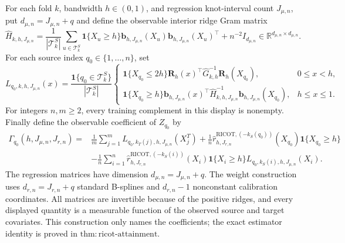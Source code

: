 For each fold \(k\), bandwidth \(h\in(0,1)\), and regression knot-interval count \(J_{\mu,n}\), put \(d_{\mu,n}=J_{\mu,n}+q\) and define the observable interior ridge Gram matrix
\[
\widehat H_{k,h,J_{\mu,n}}
=\frac1{|\mathcal T^S_k|}\sum_{u\in\mathcal T^S_k}\mathbf 1\{X_u\ge h\}
\mathbf b_{h,J_{\mu,n}}(X_u)\mathbf b_{h,J_{\mu,n}}(X_u)^\top+n^{-2}I_{d_{\mu,n}}
\in\mathbb R^{d_{\mu,n}\times d_{\mu,n}}.
\]
For each source index \(q_0\in\{1,\ldots,n\}\), set
\[
L_{q_0,k,h,J_{\mu,n}}(x)=\frac{\mathbf 1\{q_0\in\mathcal T^S_k\}}{|\mathcal T^S_k|}
\begin{cases}
\mathbf 1\{X_{q_0}\le2h\}\mathbf R_h(x)^\top\widehat G_{k,h}^{-1}\mathbf R_h(X_{q_0}),&0\le x<h,\\
\mathbf 1\{X_{q_0}\ge h\}\mathbf b_{h,J_{\mu,n}}(x)^\top\widehat H_{k,h,J_{\mu,n}}^{-1}\mathbf b_{h,J_{\mu,n}}(X_{q_0}),&h\le x\le1.
\end{cases}
\]
For integers \(n,m\ge2\), every training complement in this display is nonempty. Finally define the observable coefficient of \(Z_{q_0}\) by
\[
\begin{aligned}
\Gamma_{q_0}(h,J_{\mu,n},J_{r,n})={}&
\frac1m\sum_{j=1}^mL_{q_0,k_T(j),h,J_{\mu,n}}(X_j^T)
+\frac1n\widehat r^{\mathrm{RICOT},(-k_S(q_0))}_{h,J_{r,n}}(X_{q_0})\mathbf 1\{X_{q_0}\ge h\}\\
&-\frac1n\sum_{i=1}^n
\widehat r^{\mathrm{RICOT},(-k_S(i))}_{h,J_{r,n}}(X_i)\mathbf 1\{X_i\ge h\}
L_{q_0,k_S(i),h,J_{\mu,n}}(X_i).
\end{aligned}
\]
The regression matrices have dimension \(d_{\mu,n}=J_{\mu,n}+q\). The weight construction uses \(d_{r,n}=J_{r,n}+q\) standard B-splines and \(d_{r,n}-1\) nonconstant calibration coordinates. All matrices are invertible because of the positive ridges, and every displayed quantity is a measurable function of the observed source and target covariates. This construction only names the coefficients; the exact estimator identity is proved in \(\mathrm{thm:ricot\text{-}attainment}\).